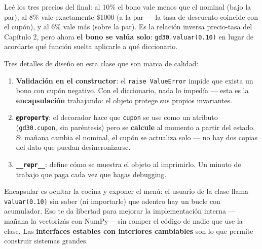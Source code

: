 \documentclass[
  spanish,
  letterpaper,
  DIV=11,
  numbers=noendperiod]{scrreprt}
\providecommand{\tightlist}{%
  \setlength{\itemsep}{0pt}\setlength{\parskip}{0pt}}
\begin{document}
Leé los tres precios del final: al 10\% el bono vale menos que el
nominal (bajo la par), al 8\% vale exactamente \$1000 (a la par --- la
tasa de descuento coincide con el cupón), y al 6\% vale más (sobre la
par). Es la relación inversa precio-tasa del Capítulo 2, pero ahora
\textbf{el bono se valúa solo}: \texttt{gd30.valuar(0.10)} en lugar de
acordarte qué función suelta aplicarle a qué diccionario.

Tres detalles de diseño en esta clase que son marca de calidad:

\begin{enumerate}
\def\labelenumi{\arabic{enumi}.}
\tightlist
\item
  \textbf{Validación en el constructor}: el \texttt{raise\ ValueError}
  impide que exista un bono con cupón negativo. Con el diccionario, nada
  lo impedía --- esta es la \textbf{encapsulación} trabajando: el objeto
  protege sus propios invariantes.
\item
  \textbf{\texttt{@property}}: el decorador hace que \texttt{cupon} se
  use como un atributo (\texttt{gd30.cupon}, sin paréntesis) pero se
  \textbf{calcule} al momento a partir del estado. Si mañana cambia el
  nominal, el cupón se actualiza solo --- no hay dos copias del dato que
  puedan desincronizarse.
\item
  \textbf{\texttt{\_\_repr\_\_}}: define cómo se muestra el objeto al
  imprimirlo. Un minuto de trabajo que paga cada vez que hagas
  debugging.
\end{enumerate}

\begin{tcolorbox}[enhanced jigsaw, bottomrule=.15mm, colback=white, opacitybacktitle=0.6, arc=.35mm, toprule=.15mm, opacityback=0, breakable, titlerule=0mm, left=2mm, coltitle=black, colbacktitle=quarto-callout-tip-color!10!white, colframe=quarto-callout-tip-color-frame, leftrule=.75mm, toptitle=1mm, bottomtitle=1mm, title=\textcolor{quarto-callout-tip-color}{\faLightbulb}\hspace{0.5em}{Encapsulación: la idea de fondo}, rightrule=.15mm]

Encapsular es ocultar la cocina y exponer el menú: el usuario de la
clase llama \texttt{valuar(0.10)} sin saber (ni importarle) que adentro
hay un bucle con acumulador. Eso te da libertad para mejorar la
implementación interna ---mañana la vectorizás con NumPy--- sin romper
el código de nadie que use la clase. Las \textbf{interfaces estables con
interiores cambiables} son lo que permite construir sistemas grandes.

\end{tcolorbox}
\end{document}
